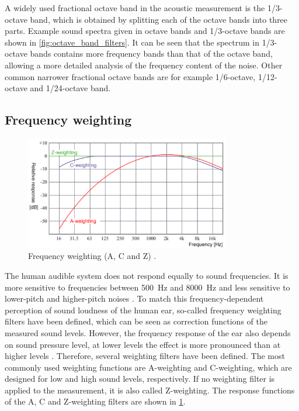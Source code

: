 \noindent A widely used fractional octave band in the acoustic measurement is the 1/3-octave band, which is obtained by splitting each of the octave bands into three parts. Example sound spectra given in octave bands and 1/3-octave bands are shown in \cref{fig:octave_band_filters}. It can be seen that the spectrum in 1/3-octave bands contains more frequency bands than that of the octave band, allowing a more detailed analysis of the frequency content of the noise. Other common narrower fractional octave bands are for example 1/6-octave, 1/12-octave and 1/24-octave band.

\newpage
\subsection{Frequency weighting}

\begin{figure}[H]
	\centering
	\includegraphics[width=0.8\textwidth]{fig/frequency_weighting.png}
	\caption{Frequency weighting (A, C and Z) \cite{Frquency_weighting}.}
	\label{fig:weighting}
\end{figure}

The human audible system does not respond equally to sound frequencies. It is more sensitive to frequencies between \SI{500}{\hertz} and \SI{8000}{\hertz} and less sensitive to lower-pitch and higher-pitch noises \cite{weighting_filters}. To match this frequency-dependent perception of sound loudness of the human ear, so-called frequency weighting filters have been defined, which can be seen as correction functions of the measured sound levels. However, the frequency response of the ear also depends on sound pressure level, at lower levels the effect is more pronounced than at higher levels \cite{heutschi_lecture_2016}. Therefore, several weighting filters have been defined. The most commonly used weighting functions are A-weighting and C-weighting, which are designed for low and high sound levels, respectively. If no weighting filter is applied to the measurement, it is also called Z-weighting. The response functions of the A, C and Z-weighting filters are shown in \cref{fig:weighting}.

